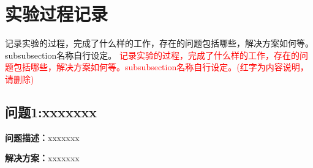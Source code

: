 \section{实验过程记录}
记录实验的过程，完成了什么样的工作，存在的问题包括哪些，解决方案如何等。subsubsection名称自行设定。
\textcolor{red}{记录实验的过程，完成了什么样的工作，存在的问题包括哪些，解决方案如何等。subsubsection名称自行设定。(红字为内容说明，请删除)}

\subsection{问题1:xxxxxxx}
\textbf{问题描述：}xxxxxxx

\textbf{解决方案：}xxxxxxx